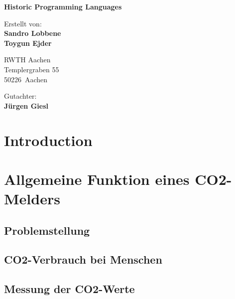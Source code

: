 \documentclass[12pt,a4paper,oneside,english]{article}
\title{\haThema}
\author{\haAutor}
\date{\today}
\newcommand{\leadingzero}[1]{\ifnum #1<10 0\the#1\else\the#1\fi}
\newcommand{\datumVonHeute}{\leadingzero{\day}.\leadingzero{\month}.\the\year}
\newcommand{\haThema}{Historic Programming Languages}
\newcommand{\haAutor}{Sandro Lobbene\\Toygun Ejder}
\newcommand{\haSchule}{RWTH Aachen}
\newcommand{\haSchuleAdresse}{Templergraben 55}
\newcommand{\haSchulePLZ}{50226}
\newcommand{\haSchuleOrt}{Aachen}
\newcommand{\haGutachter}{Jürgen Giesl}
\begin{document}
\begin{titlepage}
\begin{center}
{\LARGE\bfseries \haThema \par}
\vfill
\begin{figure}[hbtp]
\begin{center}
\end{center}
\end{figure}

Erstellt von:\\ {\bfseries \haAutor}\\ 
 
\par
\vspace{1cm}
{\haSchule \\ \haSchuleAdresse \\ \haSchulePLZ~\haSchuleOrt \par}
\vspace{1cm}
Gutachter:\\ {\bfseries \haGutachter}
\vfill
\end{center}
\end{titlepage}
\thispagestyle{empty}
\newpage

\setcounter{page}{1}


\section{Introduction}


\newpage
\section{Allgemeine Funktion eines CO2-Melders}
\subsection {Problemstellung}

\subsection{CO2-Verbrauch bei Menschen}
\subsection{Messung der CO2-Werte}
\label{lblMessungderWerte}
\end{document}
